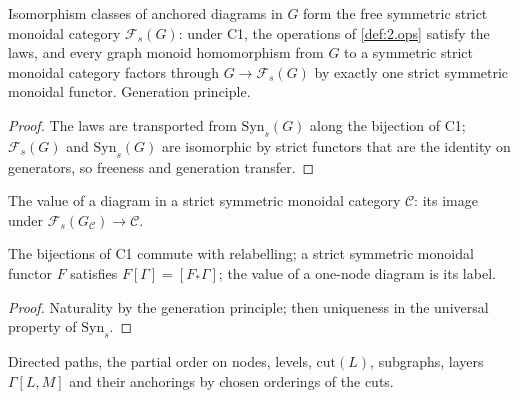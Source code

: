 \begin{theorem}
\label{thm:2.3}
\leanok
{}
Isomorphism classes of anchored diagrams in $G$ form the free symmetric strict
monoidal category $\mathcal F_s(G)$: under C1, the operations of
\ref{def:2.ops} satisfy the laws, and every graph monoid homomorphism from $G$ to a
symmetric strict monoidal category factors through $G \to \mathcal F_s(G)$ by
exactly one strict symmetric monoidal functor. Generation principle.
\end{theorem}
\begin{proof}
\leanok
The laws are transported from $\mathrm{Syn}_s(G)$ along the bijection of C1;
$\mathcal F_s(G)$ and $\mathrm{Syn}_s(G)$ are isomorphic by strict functors that
are the identity on generators, so freeness and generation transfer.
\end{proof}

\begin{definition}
\label{def:2.value}
\leanok
{}
The value of a diagram in a strict symmetric monoidal category $\mathcal C$:
its image under $\mathcal F_s(G_{\mathcal C}) \to \mathcal C$.
\end{definition}

\begin{theorem}
\label{thm:2.value}
\leanok
{}
The bijections of C1 commute with relabelling; a strict symmetric monoidal
functor $F$ satisfies $F[\Gamma] = [F_*\Gamma]$; the value of a one-node diagram
is its label.
\end{theorem}
\begin{proof}
\leanok
Naturality by the generation principle; then uniqueness in the universal
property of $\mathrm{Syn}_s$.
\end{proof}

\begin{definition}
\label{def:2.layers}
\leanok
{}
Directed paths, the partial order on nodes, levels, $\mathrm{cut}(L)$, subgraphs,
layers $\Gamma[L, M]$ and their anchorings by chosen orderings of the cuts.
\end{definition}

